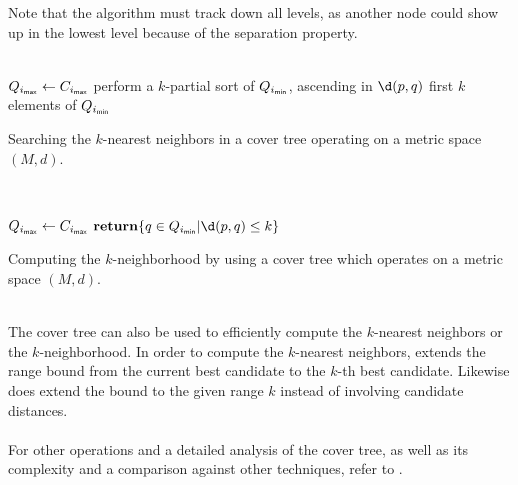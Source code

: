 	Note that the algorithm must track down all levels, as another node could show up in the lowest level because of
	the separation property.\\\\
	\IncMargin{1em}
	\begin{algorithm}
		\BlankLine
		\BlankLine
		$Q_{i_{\textsf{max}}} \leftarrow C_{i_{\textsf{max}}}$\;
		\BlankLine
		perform a $k$-partial sort of $Q_{i_{\textsf{min}}}$, ascending in $\d(p, q)$\;
		\Return first $k$ elements of $Q_{i_{\textsf{min}}}$\;
		\BlankLine
		\caption{Searching the $k$-nearest neighbors in a cover tree operating on a metric space $(M, d)$.}\label{coverTreeKSearch}
	\end{algorithm}\DecMargin{1em}\quad\\
	\IncMargin{1em}
	\begin{algorithm}
		\BlankLine
		\BlankLine
		$Q_{i_{\textsf{max}}} \leftarrow C_{i_{\textsf{max}}}$\;
		$\Return \{q \in Q_{i_{\vmin}} | \d(p, q) \le k\}$\;
		\BlankLine
		\caption{Computing the $k$-neighborhood by using a cover tree which operates on a metric space $(M, d)$.}\label{coverTreeKNeighborhood}
	\end{algorithm}\DecMargin{1em}\quad\\
	The cover tree can also be used to efficiently compute the $k$-nearest neighbors or the $k$-neighborhood.
	In order to compute the $k$-nearest neighbors,  extends the range bound from the current
	best candidate to the $k$-th best candidate. Likewise does  extend the bound to
	the given range $k$ instead of involving candidate distances.\\\\
	For other operations and a detailed analysis of the cover tree, as well as its complexity and a comparison
	against other techniques, refer to .
